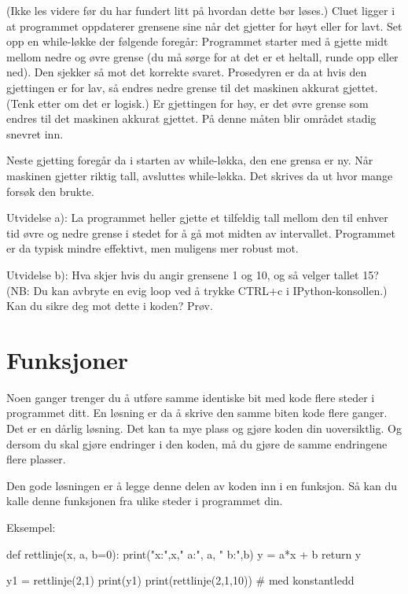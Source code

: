{\begin{question}
(Ikke les videre før du har fundert litt på hvordan dette bør løses.) 
Cluet ligger i at programmet oppdaterer grensene sine når det gjetter for høyt
eller for lavt. 
Set opp en while-løkke der følgende foregår: 
Programmet starter med å gjette midt mellom nedre og øvre grense
(du må sørge for at det er et heltall, runde opp eller ned).
Den sjekker så mot det korrekte svaret. 
Prosedyren er da at hvis den gjettingen er for lav,
så endres nedre grense til det maskinen akkurat gjettet.
(Tenk etter om det er logisk.) 
Er gjettingen for høy, er det øvre grense som endres til det maskinen akkurat gjettet.
På denne måten blir området stadig snevret inn.

Neste gjetting foregår da i starten av while-løkka, den ene grensa er ny. 
Når maskinen gjetter riktig tall, avsluttes while-løkka.
Det skrives da ut hvor mange forsøk den brukte. 

Utvidelse a): La programmet heller gjette et tilfeldig tall mellom den til enhver tid
øvre og nedre grense i stedet for å gå mot midten av intervallet.
Programmet er da typisk mindre effektivt, men muligens mer robust mot.

Utvidelse b): Hva skjer hvis du angir grensene 1 og 10, og så velger tallet 15?
(NB: Du kan avbryte en evig loop ved å trykke CTRL+c i IPython-konsollen.) 
Kan du sikre deg mot dette i koden? Prøv. 
\end{question}

\section{Funksjoner}

Noen ganger trenger du å utføre samme identiske bit med kode flere steder i programmet ditt. En løsning er da å skrive den samme biten kode flere ganger. Det er en dårlig løsning. Det kan ta mye plass og gjøre koden din uoversiktlig. Og dersom du skal gjøre endringer i den koden, må du gjøre de samme endringene flere plasser. 

Den gode løsningen er å legge denne delen av koden inn i en funksjon. Så kan du kalle denne funksjonen fra ulike steder i programmet din.

Eksempel:
\begin{usncodebox}
def rettlinje(x, a, b=0):
    print("x:",x,"  a:", a, "  b:",b)
    y = a*x + b
    return y
    
y1 = rettlinje(2,1)
print(y1)
print(rettlinje(2,1,10))   # med konstantledd
\end{usncodebox}

}
